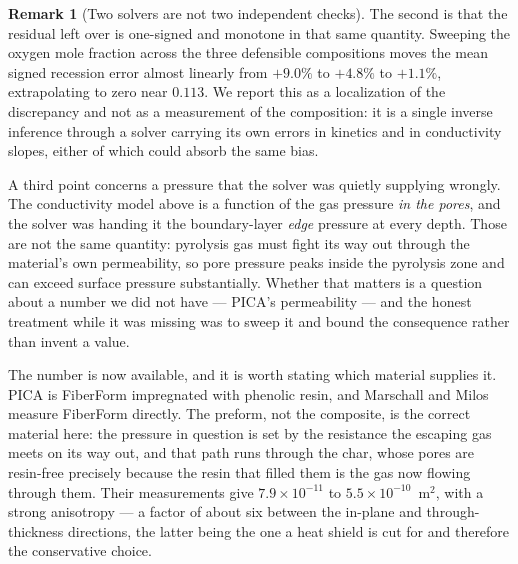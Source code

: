 \documentclass[11pt,a4paper]{article}
\theoremstyle{definition}
\newtheorem{remark}[theorem]{Remark}
\numberwithin{equation}{section}
\begin{document}
\begin{remark}[Two solvers are not two independent checks]
The second is that the residual left over is one-signed and monotone in that same quantity. Sweeping the oxygen mole fraction across the three defensible compositions moves the mean signed recession error almost linearly from $+9.0\%$ to $+4.8\%$ to $+1.1\%$, extrapolating to zero near $0.113$. We report this as a localization of the discrepancy and not as a measurement of the composition: it is a single inverse inference through a solver carrying its own errors in kinetics and in conductivity slopes, either of which could absorb the same bias.

A third point concerns a pressure that the solver was quietly supplying wrongly. The conductivity model above is a function of the gas pressure \emph{in the pores}, and the solver was handing it the boundary-layer \emph{edge} pressure at every depth. Those are not the same quantity: pyrolysis gas must fight its way out through the material's own permeability, so pore pressure peaks inside the pyrolysis zone and can exceed surface pressure substantially. Whether that matters is a question about a number we did not have --- PICA's permeability --- and the honest treatment while it was missing was to sweep it and bound the consequence rather than invent a value.

The number is now available, and it is worth stating which material supplies it. PICA is FiberForm impregnated with phenolic resin, and Marschall and Milos \cite{marschall1998} measure FiberForm directly. The preform, not the composite, is the correct material here: the pressure in question is set by the resistance the escaping gas meets on its way out, and that path runs through the char, whose pores are resin-free precisely because the resin that filled them is the gas now flowing through them. Their measurements give $7.9\times10^{-11}$ to $5.5\times10^{-10}$~m$^2$, with a strong anisotropy --- a factor of about six between the in-plane and through-thickness directions, the latter being the one a heat shield is cut for and therefore the conservative choice.


\end{remark}
\end{document}
